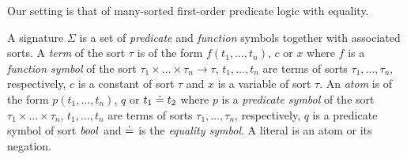 Our setting is that of many-sorted first-order predicate logic with equality.

%
%
%

A signature $\Sigma$ is a set of \emph{predicate} and \emph{function} symbols together with associated sorts. 
A \emph{term} of the sort $\tau$ is of the form $f(t_1,\ldots,t_n)$, $c$ or $x$ where
$f$ is a \emph{function symbol} of the sort $\tau_1\times\ldots\times\tau_n \to \tau$, 
$t_1,\ldots, t_n$ are terms of sorts $\tau_1,\ldots,\tau_n$, respectively, 
$c$ is a constant of sort $\tau$ and $x$ is a variable of sort $\tau$. 
%
An \emph{atom} is of the form $p(t_1,\ldots,t_n)$, $q$ or $t_1 \doteq t_2$ where $p$ is a \emph{predicate symbol} of the sort $\tau_1\times\ldots\times\tau_n$, %
$t_1, \ldots, t_n$ are terms of sorts $\tau_1,\ldots,\tau_n$, respectively,
$q$ is a predicate symbol of sort $\mathit{bool}$ and $\doteq$ is the \emph{equality symbol}.  
A literal is an atom or its negation.

